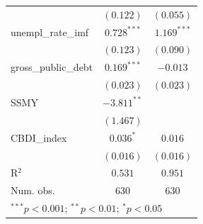 \begin{table}
\begin{center}
\begin{tabular}{l c c}
                    & $(0.122)$      & $(0.055)$      \\
unempl\_rate\_imf   & $0.728^{***}$  & $1.169^{***}$  \\
                    & $(0.123)$      & $(0.090)$      \\
gross\_public\_debt & $0.169^{***}$  & $-0.013$       \\
                    & $(0.023)$      & $(0.023)$      \\
SSMY                & $-3.811^{**}$  &                \\
                    & $(1.467)$      &                \\
CBDI\_index         & $0.036^{*}$    & $0.016$        \\
                    & $(0.016)$      & $(0.016)$      \\
\hline
R$^2$               & $0.531$        & $0.951$        \\
Num. obs.           & $630$          & $630$          \\
\hline
\multicolumn{3}{l}{\scriptsize{$^{***}p<0.001$; $^{**}p<0.01$; $^{*}p<0.05$}}
\end{tabular}
\label{table:coefficients}
\end{center}
\end{table}
